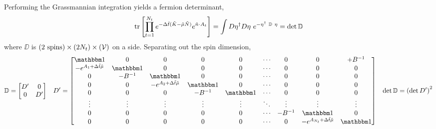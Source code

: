 Performing the Grassmannian integration yields a fermion determinant,
\begin{align}
	\text{tr}\left[\prod_{t=1}^{N_t} e^{-\Delta \tilde{t}(\tilde{K} - \tilde{\mu} \tilde{N})} e^{ \tilde{n}\cdot A_t} \right]
	=
	\int D\eta{}^{\dagger} D\eta ~ e^{- \eta^{\dagger} ~ \mathbb{D} ~ \eta} = \det \mathbb{D}
\end{align}
where $\DD$ is $(2\text{ spins})\times(2N_t)\times(\mathcal{V})$ on a side.
Separating out the spin dimension,
\begin{align}
	\DD
	&=
	\begin{bmatrix} D' & 0 \\ 0 & D' \end{bmatrix}
	&
	D'
	&=
	\begin{bmatrix} 
		\one                                & 0         & 0                                     & 0         & 0      & \cdots & 0       & 0                                         & +B^{-1}
	\\	-e^{A_1+\Delta\tilde{t}\tilde{\mu}} & \one      & 0                                     & 0         & 0      & \cdots & 0       & 0                                         & 0
	\\	0                                   & -B^{-1}   & \one                                  & 0         & 0      & \cdots & 0       & 0                                         & 0
	\\	0                                   & 0         & -e^{A_2+\Delta\tilde{t}\tilde{\mu}}   & \one      & 0      & \cdots & 0       & 0                                         & 0
	\\	0                                   & 0         & 0                                     & -B^{-1}   & \one   & \cdots & 0       & 0                                         & 0
	\\	\vdots                              & \vdots    & \vdots                                & \vdots    & \vdots & \ddots & \vdots  & \vdots                                    & \vdots
	\\	0                                   & 0         & 0                                     & 0         & 0      & \cdots & -B^{-1} & \one                                      & 0
	\\	0                                   & 0         & 0                                     & 0         & 0      & \cdots & 0       & -e^{A_{N_t}+\Delta\tilde{t}\tilde{\mu}}   & \one
	\end{bmatrix}
	&
	\det\DD = \left(\det D'\right)^2
\end{align}
